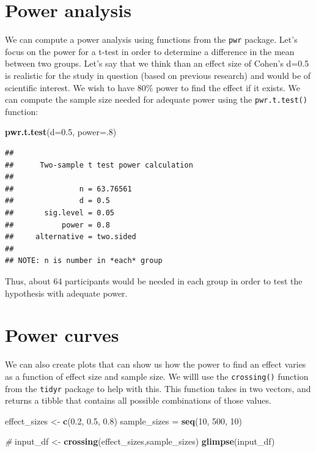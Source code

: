 \documentclass[12pt,]{book}
\newenvironment{Shaded}{\begin{snugshade}}{\end{snugshade}}
\newcommand{\CommentTok}[1]{\textcolor[rgb]{0.56,0.35,0.01}{\textit{#1}}}
\newcommand{\DataTypeTok}[1]{\textcolor[rgb]{0.13,0.29,0.53}{#1}}
\newcommand{\DecValTok}[1]{\textcolor[rgb]{0.00,0.00,0.81}{#1}}
\newcommand{\FloatTok}[1]{\textcolor[rgb]{0.00,0.00,0.81}{#1}}
\newcommand{\KeywordTok}[1]{\textcolor[rgb]{0.13,0.29,0.53}{\textbf{#1}}}
\newcommand{\NormalTok}[1]{#1}
\newcommand{\StringTok}[1]{\textcolor[rgb]{0.31,0.60,0.02}{#1}}
\begin{document}
\hypertarget{power-analysis}{%
\section{Power analysis}\label{power-analysis}}

We can compute a power analysis using functions from the \texttt{pwr} package. Let's focus on the power for a t-test in order to determine a difference in the mean between two groups. Let's say that we think than an effect size of Cohen's d=0.5 is realistic for the study in question (based on previous research) and would be of scientific interest. We wish to have 80\% power to find the effect if it exists. We can compute the sample size needed for adequate power using the \texttt{pwr.t.test()} function:

\begin{Shaded}
\begin{Highlighting}[]
\KeywordTok{pwr.t.test}\NormalTok{(}\DataTypeTok{d=}\FloatTok{0.5}\NormalTok{, }\DataTypeTok{power=}\NormalTok{.}\DecValTok{8}\NormalTok{)}
\end{Highlighting}
\end{Shaded}

\begin{verbatim}
## 
##      Two-sample t test power calculation 
## 
##               n = 63.76561
##               d = 0.5
##       sig.level = 0.05
##           power = 0.8
##     alternative = two.sided
## 
## NOTE: n is number in *each* group
\end{verbatim}

Thus, about 64 participants would be needed in each group in order to test the hypothesis with adequate power.

\hypertarget{power-curves}{%
\section{Power curves}\label{power-curves}}

We can also create plots that can show us how the power to find an effect varies as a function of effect size and sample size. We willl use the \texttt{crossing()} function from the \texttt{tidyr} package to help with this. This function takes in two vectors, and returns a tibble that contains all possible combinations of those values.

\begin{Shaded}
\begin{Highlighting}[]
\NormalTok{effect_sizes <-}\StringTok{ }\KeywordTok{c}\NormalTok{(}\FloatTok{0.2}\NormalTok{, }\FloatTok{0.5}\NormalTok{, }\FloatTok{0.8}\NormalTok{) }
\NormalTok{sample_sizes =}\StringTok{ }\KeywordTok{seq}\NormalTok{(}\DecValTok{10}\NormalTok{, }\DecValTok{500}\NormalTok{, }\DecValTok{10}\NormalTok{)}

\CommentTok{#}
\NormalTok{input_df <-}\StringTok{ }\KeywordTok{crossing}\NormalTok{(effect_sizes,sample_sizes)}
\KeywordTok{glimpse}\NormalTok{(input_df)}
\end{Highlighting}
\end{Shaded}
\end{document}
